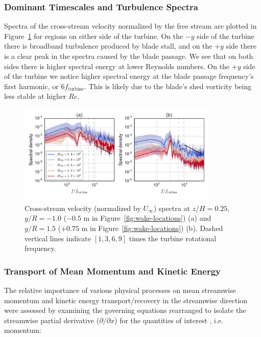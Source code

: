 \documentclass[energies,article,accept,moreauthors,pdftex,12pt,a4paper]{mdpi}
\begin{document}
\subsubsection{Dominant Timescales and Turbulence Spectra}

Spectra of the cross-stream velocity normalized by the free stream are plotted
in Figure~\ref{fig:wake-spectra} for regions on either side of the turbine. On
the $-y$ side of the turbine there is broadband turbulence produced by blade
stall, and on the $+y$ side there is a clear peak in the spectra caused by the
blade passage. We see that on both sides there is higher spectral energy at
lower Reynolds numbers. On the $+y$ side of the turbine we notice higher
spectral energy at the blade passage frequency's first harmonic, or $6
f_\mathrm{turbine}$. This is likely due to the blade's shed vorticity being less
stable at higher $Re$.

\begin{figure}[ht!]
\centering

\includegraphics[width=0.85\textwidth]{figures/wake_spectra}

\caption{Cross-stream velocity (normalized by $U_\infty$) spectra at $z/H=0.25$,
    $y/R=-1.0$ ($-0.5$ m in Figure~\ref{fig:wake-locations}) (a) and $y/R=1.5$
    ($+0.75$ m in Figure~\ref{fig:wake-locations}) (b). Dashed vertical lines
    indicate $[1, 3, 6, 9]$ times the turbine rotational frequency.}

\label{fig:wake-spectra}
\end{figure}



\subsubsection{Transport of Mean Momentum and Kinetic Energy}

The relative importance of various physical processes on mean streamwise
momentum and kinetic energy transport/recovery in the streamwise direction were
assessed by examining the governing equations rearranged to isolate the
streamwise partial derivative ($\partial / \partial x$) for the quantities of
interest \cite{Bachant2015-JoT}, i.e. momentum:
\end{document}
